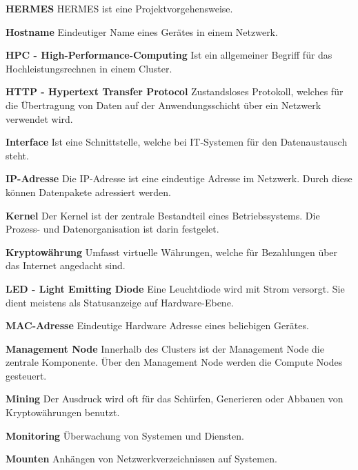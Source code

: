 \textbf{HERMES}\newline
HERMES ist eine Projektvorgehensweise.

\textbf{Hostname}\newline
Eindeutiger Name eines Gerätes in einem Netzwerk.

\textbf{HPC - High-Performance-Computing}\newline
Ist ein allgemeiner Begriff für das Hochleistungsrechnen in einem Cluster.

\textbf{HTTP - Hypertext Transfer Protocol}\newline
Zustandsloses Protokoll, welches für die Übertragung von Daten auf der Anwendungsschicht über ein Netzwerk verwendet wird.

\textbf{Interface}\newline
Ist eine Schnittstelle, welche bei IT-Systemen für den Datenaustausch steht.

\textbf{IP-Adresse}\newline
Die IP-Adresse ist eine eindeutige Adresse im Netzwerk. Durch diese können Datenpakete adressiert werden. 

\textbf{Kernel}\newline
Der Kernel ist der zentrale Bestandteil eines Betriebssystems. Die Prozess- und Datenorganisation ist darin festgelet.

\textbf{Kryptowährung}\newline
Umfasst virtuelle Währungen, welche für Bezahlungen über das Internet angedacht sind.

\textbf{LED - Light Emitting Diode}\newline
Eine Leuchtdiode wird mit Strom versorgt. Sie dient meistens als Statusanzeige auf Hardware-Ebene.

\textbf{MAC-Adresse}\newline 
Eindeutige Hardware Adresse eines beliebigen Gerätes.

\textbf{Management Node}\newline
Innerhalb des Clusters ist der Management Node die zentrale Komponente. Über den Management Node werden die Compute Nodes gesteuert.

\textbf{Mining}\newline
Der Ausdruck wird oft für das Schürfen, Generieren oder Abbauen von Kryptowährungen benutzt.

\textbf{Monitoring}\newline
Überwachung von Systemen und Diensten.

\textbf{Mounten}\newline
Anhängen von Netzwerkverzeichnissen auf Systemen.

